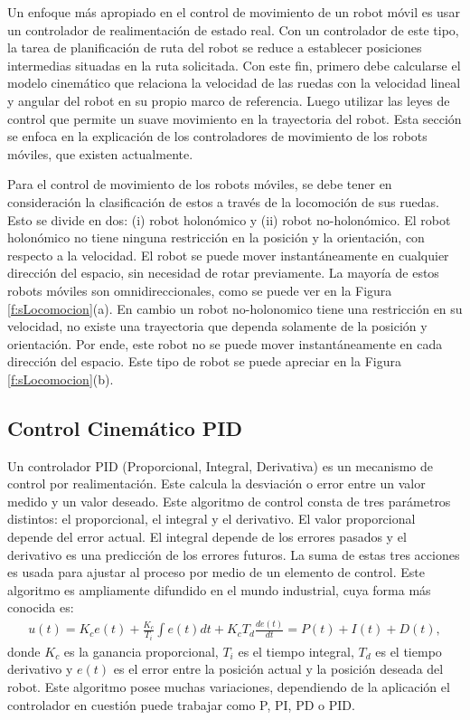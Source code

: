 Un enfoque más apropiado en el control de movimiento de un robot móvil es usar 
un controlador de realimentación de estado real. Con un controlador de este tipo, 
la tarea de planificación de ruta del robot se reduce a establecer posiciones 
intermedias situadas en la ruta solicitada. Con este fin, primero debe calcularse 
el modelo cinemático que relaciona la velocidad de las ruedas con la velocidad 
lineal y angular del robot en su propio marco de referencia. Luego utilizar las 
leyes de control que permite un suave movimiento en la trayectoria del robot. Esta
sección se enfoca en la explicación de los controladores de movimiento de 
los robots móviles, que existen actualmente.

Para el control de movimiento de los robots móviles, se debe tener en consideración 
la clasificación de estos a través de la locomoción de sus ruedas. Esto se divide 
en dos: (i) robot holonómico y (ii) robot no-holonómico. El robot holonómico 
no tiene ninguna restricción en la posición y la orientación, con respecto a la 
velocidad. El robot se puede mover instantáneamente en cualquier dirección 
del espacio, sin necesidad de rotar previamente. La mayoría de estos robots 
móviles son omnidireccionales, como se puede ver en la Figura 
\ref{f:sLocomocion}(a). En cambio un robot no-holonomico tiene una restricción 
en su velocidad, no existe una trayectoria que dependa solamente de la posición y 
orientación. Por ende, este robot no se puede mover instantáneamente en cada 
dirección del espacio. Este tipo de robot se puede apreciar en la 
Figura \ref{f:sLocomocion}(b).

\subsection{Control Cinemático PID}

Un controlador PID (Proporcional, Integral, Derivativa) es un mecanismo de control 
por realimentación. Este calcula la desviación o error entre un valor medido y 
un valor deseado. Este algoritmo de control consta de tres parámetros distintos: el 
proporcional, el integral y el derivativo. El valor proporcional depende del error 
actual. El integral depende de los errores pasados y el derivativo es una predicción 
de los errores futuros. La suma de estas tres acciones es usada para ajustar al 
proceso por medio de un elemento de control. Este algoritmo es ampliamente 
difundido en el mundo industrial, cuya forma más conocida es:
\begin{align*}
u(t) = K_c e(t) + \frac{K_c}{T_i} \int e(t)dt + K_c T_d \frac{de(t)}{dt} = P(t) + I(t) + D(t),
\end{align*}
donde $K_c$ es la ganancia proporcional, $T_i$ es el tiempo integral, $T_d$ es 
el tiempo derivativo y $e(t)$ es el error entre la posición actual y la posición 
deseada del robot. Este algoritmo posee muchas variaciones, dependiendo de la 
aplicación el controlador en cuestión puede trabajar como P, PI, PD o PID.

